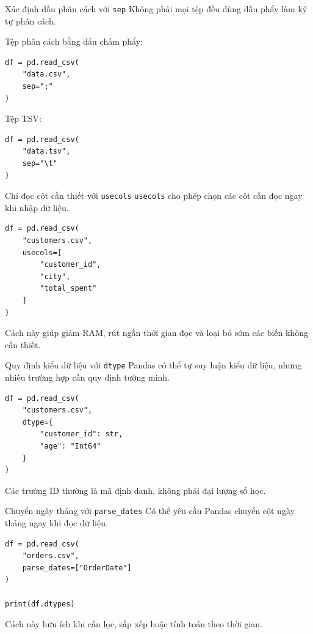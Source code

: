\documentclass[aspectratio=169,11pt]{beamer}
\newcommand{\code}[1]{\texttt{#1}}
\begin{document}
\begin{frame}[fragile]{Xác định dấu phân cách với \code{sep}}
Không phải mọi tệp đều dùng dấu phẩy làm ký tự phân cách.

Tệp phân cách bằng dấu chấm phẩy:
\begin{lstlisting}[style=pythonstyle]
df = pd.read_csv(
    "data.csv",
    sep=";"
)
\end{lstlisting}

Tệp TSV:
\begin{lstlisting}[style=pythonstyle]
df = pd.read_csv(
    "data.tsv",
    sep="\t"
)
\end{lstlisting}
\end{frame}

\begin{frame}[fragile]{Chỉ đọc cột cần thiết với \code{usecols}}
\code{usecols} cho phép chọn các cột cần đọc ngay khi nhập dữ liệu.

\begin{lstlisting}[style=pythonstyle]
df = pd.read_csv(
    "customers.csv",
    usecols=[
        "customer_id",
        "city",
        "total_spent"
    ]
)
\end{lstlisting}

Cách này giúp giảm RAM, rút ngắn thời gian đọc và loại bỏ sớm các biến không cần thiết.
\end{frame}

\begin{frame}[fragile]{Quy định kiểu dữ liệu với \code{dtype}}
Pandas có thể tự suy luận kiểu dữ liệu, nhưng nhiều trường hợp cần quy định tường minh.

\begin{lstlisting}[style=pythonstyle]
df = pd.read_csv(
    "customers.csv",
    dtype={
        "customer_id": str,
        "age": "Int64"
    }
)
\end{lstlisting}

Các trường ID thường là mã định danh, không phải đại lượng số học.
\end{frame}

\begin{frame}[fragile]{Chuyển ngày tháng với \code{parse\_dates}}
Có thể yêu cầu Pandas chuyển cột ngày tháng ngay khi đọc dữ liệu.

\begin{lstlisting}[style=pythonstyle]
df = pd.read_csv(
    "orders.csv",
    parse_dates=["OrderDate"]
)

print(df.dtypes)
\end{lstlisting}

Cách này hữu ích khi cần lọc, sắp xếp hoặc tính toán theo thời gian.
\end{frame}
\end{document}
